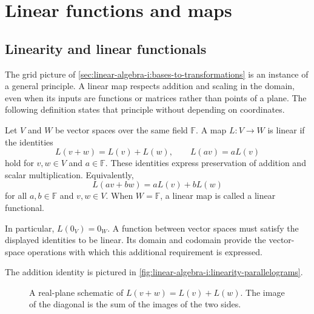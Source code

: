 \section{Linear functions and maps}
\label{sec:linear-algebra-i:linear-functions-and-maps}

\subsection{Linearity and linear functionals}

The grid picture of
\autoref{sec:linear-algebra-i:bases-to-transformations} is an instance of
a general principle. A linear map respects addition and scaling in the
domain, even when its inputs are functions or matrices rather than points
of a plane. The following definition states that principle without
depending on coordinates.

\begin{definition}
  Let \(V\) and \(W\) be vector spaces over the same field \(\mathbb F\).
  A map \(L:V\to W\) is linear if the identities
  \[
    L(v+w)=L(v)+L(w),\qquad L(av)=aL(v)
  \]
  hold for \(v,w\in V\) and \(a\in\mathbb F\). These identities
  express preservation of addition and scalar multiplication. Equivalently,
  \[
    L(av+bw)=aL(v)+bL(w)
  \]
  for all \(a,b\in\mathbb F\) and \(v,w\in V\).
  When \(W=\mathbb F\), a linear map is called a linear functional.
\end{definition}

In particular, \(L(0_V)=0_W\).
A function between vector spaces must satisfy the displayed identities to
be linear. Its domain and codomain provide the vector-space operations
with which this additional requirement is expressed.

The addition identity is pictured in
\autoref{fig:linear-algebra-i:linearity-parallelograms}.
\begin{figure}[htbp]
  \centering
  
  \caption[Linearity and parallelograms]{A real-plane schematic of
    \(L(v+w)=L(v)+L(w)\). The image of the diagonal is the sum of the
    images of the two sides.}
  \label{fig:linear-algebra-i:linearity-parallelograms}
\end{figure}

